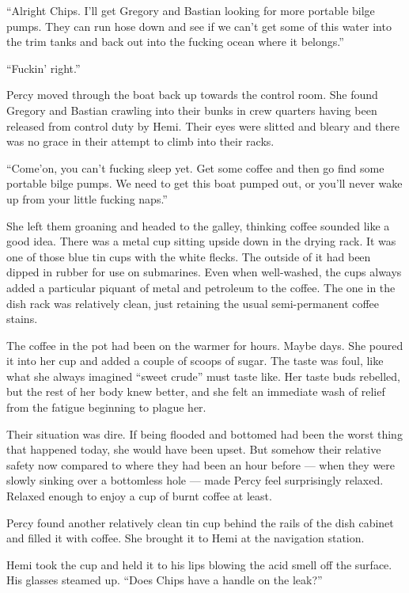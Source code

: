 \documentclass[
]{scrbook}
\begin{document}
``Alright Chips. I'll get Gregory and Bastian looking for more portable
bilge pumps. They can run hose down and see if we can't get some of this
water into the trim tanks and back out into the fucking ocean where it
belongs.''

``Fuckin' right.''

Percy moved through the boat back up towards the control room. She found
Gregory and Bastian crawling into their bunks in crew quarters having
been released from control duty by Hemi. Their eyes were slitted and
bleary and there was no grace in their attempt to climb into their
racks.

``Come'on, you can't fucking sleep yet. Get some coffee and then go find
some portable bilge pumps. We need to get this boat pumped out, or
you'll never wake up from your little fucking naps.''

She left them groaning and headed to the galley, thinking coffee sounded
like a good idea. There was a metal cup sitting upside down in the
drying rack. It was one of those blue tin cups with the white flecks.
The outside of it had been dipped in rubber for use on submarines. Even
when well-washed, the cups always added a particular piquant of metal
and petroleum to the coffee. The one in the dish rack was relatively
clean, just retaining the usual semi-permanent coffee stains.

The coffee in the pot had been on the warmer for hours. Maybe days. She
poured it into her cup and added a couple of scoops of sugar. The taste
was foul, like what she always imagined ``sweet crude'' must taste like.
Her taste buds rebelled, but the rest of her body knew better, and she
felt an immediate wash of relief from the fatigue beginning to plague
her.

Their situation was dire. If being flooded and bottomed had been the
worst thing that happened today, she would have been upset. But somehow
their relative safety now compared to where they had been an hour before
--- when they were slowly sinking over a bottomless hole --- made Percy
feel surprisingly relaxed. Relaxed enough to enjoy a cup of burnt coffee
at least.

Percy found another relatively clean tin cup behind the rails of the
dish cabinet and filled it with coffee. She brought it to Hemi at the
navigation station.

Hemi took the cup and held it to his lips blowing the acid smell off the
surface. His glasses steamed up. ``Does Chips have a handle on the
leak?''
\end{document}
